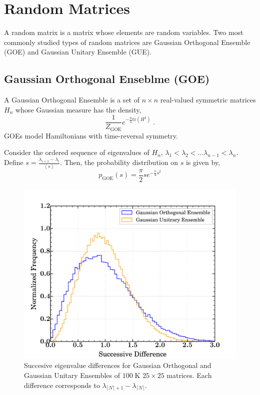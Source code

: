 \documentclass{amsproc}
\theoremstyle{definition}
\theoremstyle{remark}
\numberwithin{equation}{section}
\begin{document}
\section{Random Matrices}
A random matrix is a matrix whose elements are random variables. Two most commonly studied types of random matrices are Gaussian Orthogonal Ensemble (GOE) and Gaussian Unitary Ensemble (GUE). 

\subsection{Gaussian Orthogonal Enseblme (GOE)}
A Gaussian Orthogonal Ensemble is a set of $n \times n$ real-valued symmetric matrices $H_n$ whose Gaussian measure has the density, 
$$
\frac{1}{Z_{\mathrm{GOE}}} e^{ - \frac{n}{4} \mathrm{tr}(H^2) } \;.
$$
GOEs model Hamiltonians with time-reversal symmetry. 

Consider the ordered sequence of eigenvalues of $H_n$, $\lambda_1 < \lambda_2 < \ldots \lambda_{n - 1} < \lambda_n$. Define $s = \frac{\lambda_{i + 1} - \lambda_{i}}{ \left< s \right> }$. Then, the probability distribution on $s$ is given by, 
$$
p_{\mathrm{GOE}}(s) = \frac{\pi}{2} s e^{- \frac{\pi}{4} s^2 }
$$

\begin{figure}
\includegraphics[width=\columnwidth]{figures/random_matrices_eigenvalues_differences.pdf}
\caption{Succesive eigenvalue differences for Gaussian Orthogonal and Gaussian Unitary Ensembles of $100\;\mathrm{K}$ $25 \times 25$ matrices. Each difference corresponds to $\lambda_{\lceil N \rceil + 1} - \lambda_{ \lceil N \rceil}$.}
\label{fig:random_matrices_eigenvalues_differences}
\end{figure}
\end{document}
